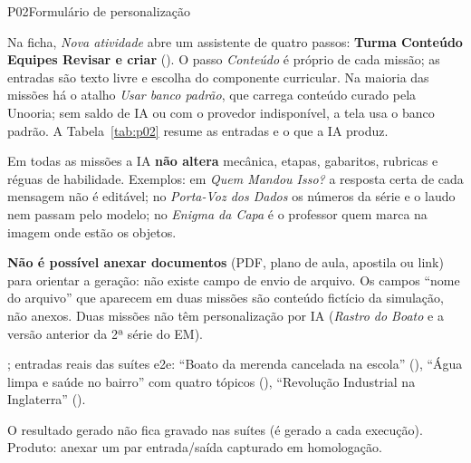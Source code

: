 \begin{resposta}{P02}{Formulário de personalização}{\variapormissao}
\begin{campos}
  \item[Hoje] Na ficha, \emph{Nova atividade} abre um assistente de quatro
    passos: \textbf{Turma \seta{} Conteúdo \seta{} Equipes \seta{} Revisar e
    criar} (). O passo \emph{Conteúdo} é próprio de cada missão;
    as entradas são texto livre e escolha do componente curricular. Na maioria
    das missões há o atalho \emph{Usar banco padrão}, que carrega conteúdo
    curado pela Unooria; sem saldo de IA ou com o provedor indisponível, a
    tela usa o banco padrão. A Tabela~\ref{tab:p02} resume as entradas e o que
    a IA produz.
  \item[Fixo] Em todas as missões a IA \textbf{não altera} mecânica, etapas,
    gabaritos, rubricas e réguas de habilidade. Exemplos: em \emph{Quem Mandou
    Isso?} a resposta certa de cada mensagem não é editável; no \emph{Porta-Voz
    dos Dados} os números da série e o laudo nem passam pelo modelo; no
    \emph{Enigma da Capa} é o professor quem marca na imagem onde estão os
    objetos.
  \item[Limitações] \textbf{Não é possível anexar documentos} (PDF, plano de
    aula, apostila ou link) para orientar a geração: não existe campo de
    envio de arquivo. Os campos ``nome do arquivo'' que aparecem em duas
    missões são conteúdo fictício da simulação, não anexos. Duas missões não
    têm personalização por IA (\emph{Rastro do Boato} e a versão anterior da
    2ª série do EM).
  \item[Evidência] ;
    entradas reais das suítes e2e: ``Boato da merenda cancelada na escola''
    (), ``Água limpa e saúde no
    bairro'' com quatro tópicos (),
    ``Revolução Industrial na Inglaterra'' ().
  \item[Lacuna] O resultado gerado não fica gravado nas suítes (é gerado a
    cada execução). Produto: anexar um par entrada/saída capturado em
    homologação.
\end{campos}
\end{resposta}

